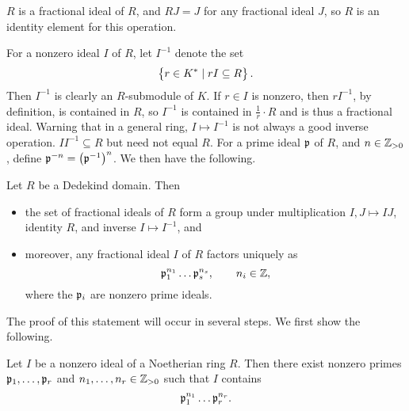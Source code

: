 \begin{note*}
$ R $ is a fractional ideal of $ R $, and $ RJ = J $ for any fractional ideal $ J $, so $ R $ is an identity element for this operation.
\end{note*}

For a nonzero ideal $ I $ of $ R $, let $ I^{-1} $ denote the set
$$ \cbr{r \in K^* \mid rI \subseteq R}. $$
Then $ I^{-1} $ is clearly an $ R $-submodule of $ K $. If $ r \in I $ is nonzero, then $ rI^{-1} $, by definition, is contained in $ R $, so $ I^{-1} $ is contained in $ \tfrac{1}{r} \cdot R $ and is thus a fractional ideal. Warning that in a general ring, $ I \mapsto I^{-1} $ is not always a good inverse operation. $ II^{-1} \subseteq R $ but need not equal $ R $. For a prime ideal $ \mathfrak{p} $ of $ R $, and $ n \in \mathbb{Z}_{> 0} $, define $ \pp^{-n} = \br{\pp^{-1}}^n $. We then have the following.

\begin{theorem}
Let $ R $ be a Dedekind domain. Then
\begin{itemize}
\item the set of fractional ideals of $ R $ form a group under multiplication $ I, J \mapsto IJ $, identity $ R $, and inverse $ I \mapsto I^{-1} $, and
\item moreover, any fractional ideal $ I $ of $ R $ factors uniquely as
$$ \mathfrak{p}_1^{n_1} \dots \mathfrak{p}_s^{n_s}, \qquad n_i \in \mathbb{Z}, $$
where the $ \mathfrak{p}_i $ are nonzero prime ideals.
\end{itemize}
\end{theorem}

\pagebreak


The proof of this statement will occur in several steps. We first show the following.

\begin{proposition}
Let $ I $ be a nonzero ideal of a Noetherian ring $ R $. Then there exist nonzero primes $ \mathfrak{p}_1, \dots, \mathfrak{p}_r $ and $ n_1, \dots, n_r \in \mathbb{Z}_{> 0} $ such that $ I $ contains
$$ \mathfrak{p}_1^{n_1} \dots \mathfrak{p}_r^{n_r}. $$
\end{proposition}

